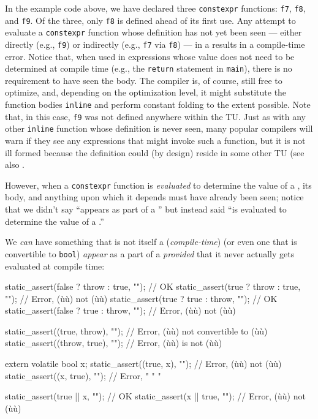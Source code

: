 \noindent In the example code above, we have declared three \lstinline!constexpr!
functions: \lstinline!f7!, \lstinline!f8!, and \lstinline!f9!. Of the three, only
\lstinline!f8! is defined ahead of its first use. Any attempt to evaluate a
\lstinline!constexpr! function whose definition has not yet been seen ---
either directly (e.g., \lstinline!f9!) or indirectly (e.g., \lstinline!f7! via
\lstinline!f8!) --- in a  results in a
compile-time error. Notice that, when used in expressions whose value
does not need to be determined at compile time (e.g., the
\lstinline!return! statement in \lstinline!main!), there is no requirement to
have seen the body. The compiler is, of course, still free to optimize,
and, depending on the optimization level, it might substitute the
function bodies \lstinline!inline! and perform constant folding to the
extent possible. Note that, in this case, \lstinline!f9! was not defined
anywhere within the TU. Just as with any other \lstinline!inline! function
whose definition is never seen, many popular compilers will warn if they
see any expressions that might invoke such a function, but it is not ill
formed because the definition could (by design) reside in some other TU
(see also .

However, when a \lstinline!constexpr! function is \emph{evaluated} to
determine the value of a , its body, and
anything upon which it depends must have already been seen; notice that
we didn't say ``appears as part of a '' but
instead said ``is evaluated to determine the value of a .''

We \emph{can} have something that is not itself a (\emph{compile-time})
 (or even one that is convertible to
\lstinline!bool!) \emph{appear} as a part of a 
\emph{provided} that it never actually gets evaluated at compile time:

\begin{emcppslisting}
static_assert(false ? throw : true,  "");  // OK
static_assert(true  ? throw : true,  "");  // Error, (ù{}ù) not (ù{}ù)
static_assert(true  ?  true : throw, "");  // OK
static_assert(false ?  true : throw, "");  // Error, (ù{}ù) not (ù{}ù)

static_assert((true, throw), "");  // Error, (ù{}ù) not convertible to (ù{}ù)
static_assert((throw, true), "");  // Error, (ù{}ù) is not (ù{}ù)

extern volatile bool x;
static_assert((true, x), "");      // Error, (ù{}ù) not (ù{}ù)
static_assert((x, true), "");      // Error,  "   "      "

static_assert(true || x,    "");   // OK
static_assert(x    || true, "");   // Error, (ù{}ù) not (ù{}ù)
\end{emcppslisting}
    

